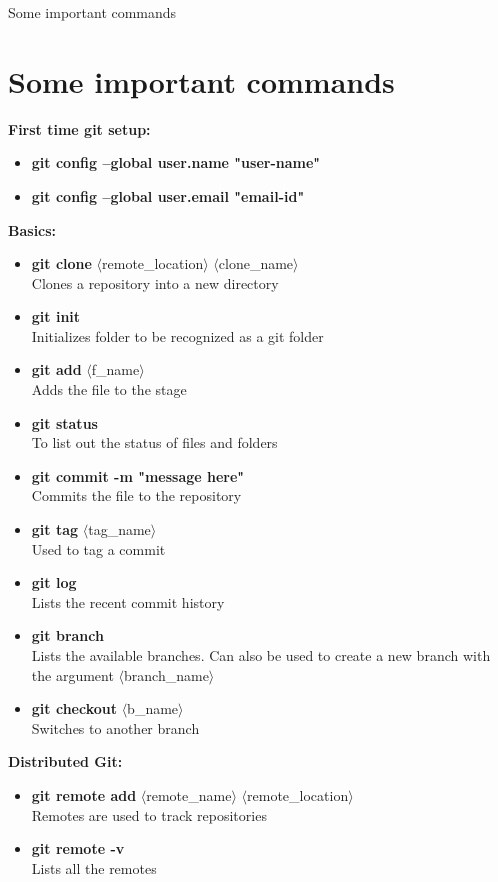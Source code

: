 \documentclass{beamer}
\begin{document}
\begin{frame}[allowframebreaks]{Some important commands}
\section{Some important commands}
\begin{adjustwidth}{-2em}{-2em}
\textbf{First time git setup:}
\begin{itemize}
	\item {\textbf{git config --global user.name "user-name"}}
	\item {\textbf{git config --global user.email "email-id"}}
\end{itemize}
\textbf{Basics:}
\begin{itemize}
	\item {\textbf{git clone} $\langle$remote\_location$\rangle$ $\langle$clone\_name$\rangle$ \\ Clones a repository into a new directory}
	\item {\textbf{git init} \\ Initializes folder to be recognized as a git folder}
	\item {\textbf{git add} $\langle$f\_name$\rangle$\\ Adds the file to the stage}
	\item {\textbf{git status} \\ To list out the status of files and folders}
	\item {\textbf{git commit -m "message here"} \\ Commits the file to the repository}
	\item {\textbf{git tag} $\langle$tag\_name$\rangle$ \\ Used to tag a commit}
	\item {\textbf{git log} \\ Lists the recent commit history}
	
	\item {\textbf{git branch} \\ Lists the available branches. Can also be used to create a new branch with the argument $\langle$branch\_name$\rangle$}
	\item {\textbf{git checkout} $\langle$b\_name$\rangle$ \\ Switches to another branch}	
\end{itemize}
\textbf{Distributed Git:}
	\begin{itemize}
		
		\item {\textbf{git remote add} $\langle$remote\_name$\rangle$ $\langle$remote\_location$\rangle$ \\ Remotes are used to track repositories}
		\item {\textbf{git remote -v} \\ Lists all the remotes}
		

\end{itemize}
\end{adjustwidth}
\end{frame}
\end{document}
